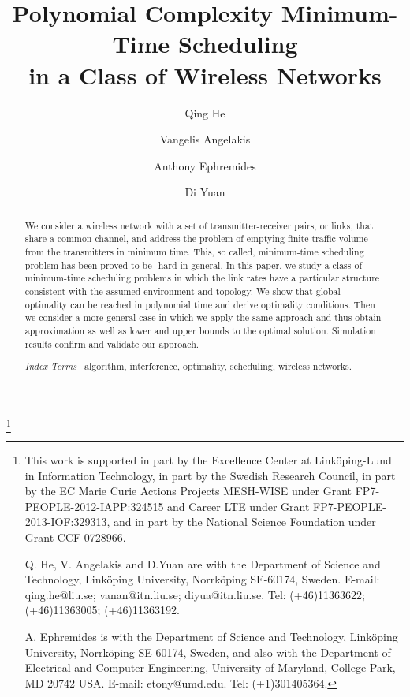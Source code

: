 \documentclass[10pt,onecolumn,journal,draftcls,oneside]{IEEEtran}
\newcounter{cond}
\begin{document}
\title{{\huge Polynomial Complexity Minimum-Time Scheduling \\ in a Class of Wireless Networks}}



\author[]{Qing He}
\author[1]{Vangelis Angelakis}
\author[1,2]{Anthony Ephremides}
\author[1]{Di Yuan}
\maketitle

\begin{abstract}

We consider a wireless network with a set of transmitter-receiver pairs, or links, that share a common channel, and address the problem of emptying finite traffic volume from the transmitters in minimum time. This, so called, minimum-time scheduling problem has been proved to be -hard in general. In this paper, we study a class of minimum-time scheduling problems in which the link rates have a particular structure consistent with the assumed environment and topology. We show that global optimality can be reached in polynomial time and derive optimality conditions. Then we consider a more general case in which we apply the same approach and thus obtain approximation as well as lower and upper bounds to the optimal solution. Simulation results confirm and validate our approach.

\emph{Index Terms--} algorithm, interference, optimality, scheduling, wireless networks.



\end{abstract}

\let\thefootnote\relax\footnote 
{This work is supported in part by the Excellence Center at Link{\"o}ping-Lund in Information Technology, in part by the Swedish Research Council, in part by the EC Marie Curie Actions Projects MESH-WISE under Grant FP7-PEOPLE-2012-IAPP:324515 and Career LTE under Grant FP7-PEOPLE-2013-IOF:329313, and in part by the National Science Foundation under Grant CCF-0728966.

Q. He, V. Angelakis and D.Yuan are with the Department of Science and Technology, Link{\"o}ping University, Norrk{\"o}ping SE-60174, Sweden. E-mail: qing.he@liu.se; vanan@itn.liu.se; diyua@itn.liu.se. Tel: (+46)11363622; (+46)11363005; (+46)11363192.

A. Ephremides is with the Department of Science and Technology, Link{\"o}ping University, Norrk{\"o}ping SE-60174, Sweden, and also with the Department of Electrical and Computer Engineering, University of Maryland, College Park, MD 20742 USA. E-mail: etony@umd.edu. Tel: (+1)301405364.}
\end{document}

